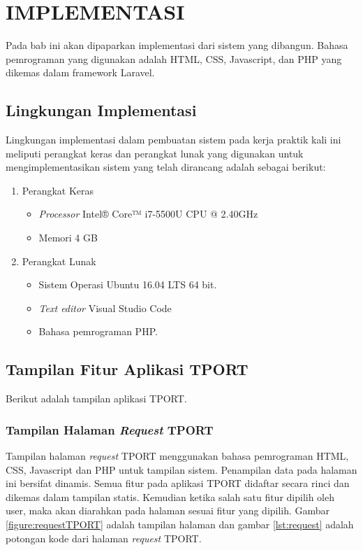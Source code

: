\chapter{IMPLEMENTASI}
Pada bab ini akan dipaparkan implementasi dari sistem yang dibangun. Bahasa pemrograman yang digunakan adalah HTML, CSS, Javascript, dan PHP yang dikemas dalam framework Laravel.

\section{Lingkungan Implementasi}
\tab Lingkungan implementasi dalam pembuatan sistem pada kerja praktik kali ini meliputi perangkat keras dan perangkat lunak yang digunakan untuk mengimplementasikan sistem yang telah dirancang adalah sebagai berikut:
\begin{enumerate}
	\item Perangkat Keras
	\begin{itemize}
	\item \textit{Processor} Intel® Core™ i7-5500U CPU @ 2.40GHz
	\item Memori 4 GB
	\end{itemize}
	\item Perangkat Lunak
	\begin{itemize}
	\item Sistem Operasi Ubuntu 16.04 LTS 64 bit.
	\item \textit{Text editor} Visual Studio Code
	\item Bahasa pemrograman PHP.
	\end{itemize}
\end{enumerate}

\section{Tampilan Fitur Aplikasi TPORT}
Berikut adalah tampilan aplikasi TPORT.

\subsection{Tampilan Halaman \textit{Request} TPORT}
Tampilan halaman \textit{request} TPORT menggunakan bahasa pemrograman HTML, CSS, Javascript dan PHP untuk tampilan sistem. Penampilan data pada halaman ini bersifat dinamis. Semua fitur pada aplikasi TPORT didaftar secara rinci dan dikemas dalam tampilan statis. Kemudian ketika salah satu fitur dipilih oleh user, maka akan diarahkan pada halaman sesuai fitur yang dipilih. Gambar \ref{figure:requestTPORT} adalah tampilan halaman dan gambar \ref{lst:request} adalah potongan kode dari halaman \textit{request} TPORT.

